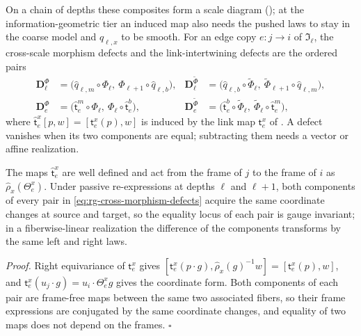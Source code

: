 On a chain of depths these composites form a scale diagram ();
at the information-geometric tier an induced map also needs the pushed laws to stay in the coarse model and
$q_{\ell,x}$ to be smooth. For an edge copy $e:j\to i$ of $\mathfrak I_\ell$, the cross-scale morphism
defects and the link-intertwining defects are the ordered pairs
\begin{equation}
\begin{aligned}
\mathbf D^\Phi_\ell&=\bigl(\widehat q_{\ell,m}\circ\Phi_\ell,\ \Phi_{\ell+1}\circ\widehat q_{\ell,b}\bigr),
&
\mathbf D^{\widetilde\Phi}_\ell&=\bigl(\widehat q_{\ell,b}\circ\widetilde\Phi_\ell,\ \widetilde\Phi_{\ell+1}\circ\widehat q_{\ell,m}\bigr),\\
\mathbf D^\Phi_e&=\bigl(\widehat{\mathsf t}^m_e\circ\Phi_\ell,\ \Phi_\ell\circ\widehat{\mathsf t}^b_e\bigr),
&
\mathbf D^{\widetilde\Phi}_e&=\bigl(\widehat{\mathsf t}^b_e\circ\widetilde\Phi_\ell,\ \widetilde\Phi_\ell\circ\widehat{\mathsf t}^m_e\bigr),
\end{aligned}
\label{eq:rg-cross-morphism-defects}
\end{equation}
where $\widehat{\mathsf t}^x_e[p,w]=[\mathsf t^x_e(p),w]$ is induced by the link map $\mathsf t^x_e$ of
. A defect vanishes when its two components are equal; subtracting
them needs a vector or affine realization.

The maps $\widehat{\mathsf t}^x_e$ are well defined and act from the frame of $j$ to the frame of $i$ as
$\widehat\rho_x(\Theta^x_e)$. Under passive re-expressions at depths $\ell$ and $\ell+1$, both components
of every pair in \eqref{eq:rg-cross-morphism-defects} acquire the same coordinate changes at source and
target, so the equality locus of each pair is gauge invariant; in a fiberwise-linear realization the
difference of the components transforms by the same left and right laws. 

\noindent\emph{Proof.}
Right equivariance of $\mathsf t^x_e$ gives
$[\mathsf t^x_e(p\cdot g),\widehat\rho_x(g)^{-1}w]=[\mathsf t^x_e(p),w]$, and
$\mathsf t^x_e(u_j\cdot g)=u_i\cdot\Theta^x_eg$ gives the coordinate form. Both components of each pair are
frame-free maps between the same two associated fibers, so their frame expressions are conjugated by the
same coordinate changes, and equality of two maps does not depend on the frames. $\square$

